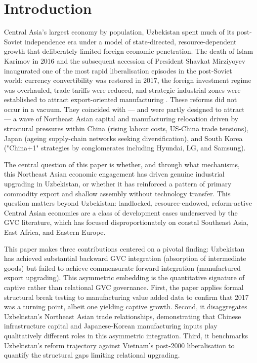 \documentclass[14pt,a4paper]{extarticle}
\begin{document}
\section{Introduction}

Central Asia's largest economy by population, Uzbekistan spent much of its post-Soviet independence era under a model of state-directed, resource-dependent growth that deliberately limited foreign economic penetration. The death of Islam Karimov in 2016 and the subsequent accession of President Shavkat Mirziyoyev inaugurated one of the most rapid liberalisation episodes in the post-Soviet world: currency convertibility was restored in 2017, the foreign investment regime was overhauled, trade tariffs were reduced, and strategic industrial zones were established to attract export-oriented manufacturing \citep{world_bank_wdi}. These reforms did not occur in a vacuum. They coincided with --- and were partly designed to attract --- a wave of Northeast Asian capital and manufacturing relocation driven by structural pressures within China (rising labour costs, US-China trade tensions), Japan (ageing supply-chain networks seeking diversification), and South Korea ("China+1" strategies by conglomerates including Hyundai, LG, and Samsung).

The central question of this paper is whether, and through what mechanisms, this Northeast Asian economic engagement has driven genuine industrial upgrading in Uzbekistan, or whether it has reinforced a pattern of primary commodity export and shallow assembly without technology transfer. This question matters beyond Uzbekistan: landlocked, resource-endowed, reform-active Central Asian economies are a class of development cases underserved by the GVC literature, which has focused disproportionately on coastal Southeast Asia, East Africa, and Eastern Europe.

This paper makes three contributions centered on a pivotal finding: Uzbekistan has achieved substantial backward GVC integration (absorption of intermediate goods) but failed to achieve commensurate forward integration (manufactured export upgrading). This asymmetric embedding is the quantitative signature of captive rather than relational GVC governance. First, the paper applies formal structural break testing to manufacturing value added data to confirm that 2017 was a turning point, albeit one yielding captive growth. Second, it disaggregates Uzbekistan's Northeast Asian trade relationships, demonstrating that Chinese infrastructure capital and Japanese-Korean manufacturing inputs play qualitatively different roles in this asymmetric integration. Third, it benchmarks Uzbekistan's reform trajectory against Vietnam's post-2000 liberalisation to quantify the structural gaps limiting relational upgrading.
\end{document}
